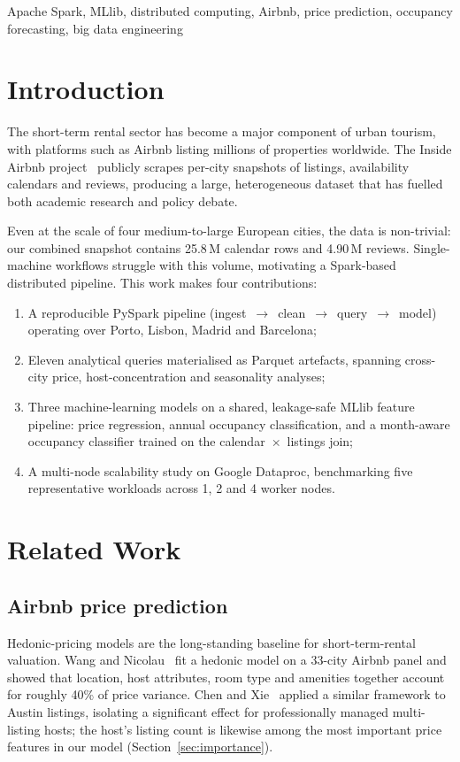\documentclass[conference]{IEEEtran}
\begin{document}
\begin{IEEEkeywords}
Apache Spark, MLlib, distributed computing, Airbnb, price prediction, occupancy forecasting, big data engineering
\end{IEEEkeywords}

\section{Introduction}

The short-term rental sector has become a major component of urban tourism, with platforms such as Airbnb listing millions of properties worldwide. The Inside Airbnb project~\cite{insideairbnb2024} publicly scrapes per-city snapshots of listings, availability calendars and reviews, producing a large, heterogeneous dataset that has fuelled both academic research and policy debate.

Even at the scale of four medium-to-large European cities, the data is non-trivial: our combined snapshot contains 25.8\,M calendar rows and 4.90\,M reviews. Single-machine workflows struggle with this volume, motivating a Spark-based distributed pipeline. This work makes four contributions:
\begin{enumerate}
  \item A reproducible PySpark pipeline (ingest~$\to$~clean~$\to$~query~$\to$~model) operating over Porto, Lisbon, Madrid and Barcelona;
  \item Eleven analytical queries materialised as Parquet artefacts, spanning cross-city price, host-concentration and seasonality analyses;
  \item Three machine-learning models on a shared, leakage-safe MLlib feature pipeline: price regression, annual occupancy classification, and a month-aware occupancy classifier trained on the calendar~$\times$~listings join;
  \item A multi-node scalability study on Google Dataproc, benchmarking five representative workloads across 1, 2 and 4 worker nodes.
\end{enumerate}

\section{Related Work}

\subsection{Airbnb price prediction}
Hedonic-pricing models are the long-standing baseline for short-term-rental valuation. Wang and Nicolau~\cite{wang2017price} fit a hedonic model on a 33-city Airbnb panel and showed that location, host attributes, room type and amenities together account for roughly 40\% of price variance. Chen and Xie~\cite{chen2017consumer} applied a similar framework to Austin listings, isolating a significant effect for professionally managed multi-listing hosts; the host's listing count is likewise among the most important price features in our model (Section~\ref{sec:importance}).
\end{document}
